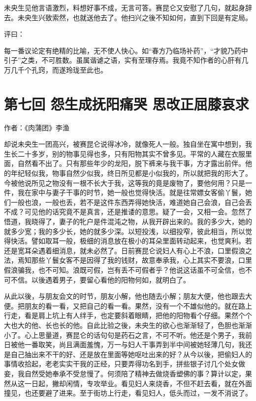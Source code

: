 \documentclass[a4paper,12pt,UTF8,twoside]{ctexbook}
\begin{document}
未央生见他言语激烈，料想好事不成，无言可答。赛昆仑又安慰了几句，就起身辞去。未央生兴致索然，也就送他去了。他扫兴之後不知如何，直到下回是有定局。

评曰：

每一番议论定有绝精的比喻，无不使人快心。如“春方乃临场补药”，“才貌乃药中引子”之类，不可胜数。虽属谐谑之语，实有至理存焉。我竟不知作者的心肝有几万几千个孔窍，而遂玲珑至此也。

\chapter{第七回 怨生成抚阳痛哭 思改正屈膝哀求}

作者：《肉蒲团》李渔

却说未央生一团高兴，被赛昆仑说得冰冷，就像死人一般。独自坐在寓中想到，我生长二十多岁，别的物事见得也多，只有阳物其实不曾多见。平常的人藏在衣服里面，自然看不出了。只有那些年少的龙阳，脱下裤来与我干事，方才露出前伴。他的年纪轻似我，物事自然少似我，终日所见都是小似我的，所以就把我的形大了。今被他说所见之物没有一根不长大于我，这等我的竟是废物了，要他何用？只是一件，我在家中与妻子干事的时节，她一般也觉得快活。就是往常嫖女客偷丫鬟，她们一般也浪，一般也丢，若不是这件东西弄得她快活，难道她自己会浪，自己会丢不成？可见他的话究竟不是真言，还是推诿的意思。疑了一会，又相一会。忽然了悟道，我晓得了，妻子的牝户是件混沌之物，从我开辟出来的。我的多少大，她的就多少宽；我的多少长，她的就多少深。以短投浅，以细投窄，彼此相当，所以觉得快活。譬如取耳一般，极细的消息放在极小的耳朵里面转动起来，也觉爽利。若还是宽耳朵遇着细消息，就未必然了。日前赛昆仑说妇人有心上不浪，口里假浪之法，焉知那些丫鬟女客不是因得了我的钱财，故意奉承我，心上其实不要浪，口里假浪骗我，也不可知。浪既可假，岂有丢不可假者乎？他说这话虽不可全信，也不可不信。以後遇着男子，要留心看他的阳物何如，就明白了。

从此以後，与朋友会文的时节，朋友小解，他也随去小解；朋友大便，他也跟去大便。把朋友的看一看，又把自己的看一看。果然，没有一个不雄似他的。就在路上行走，看是肩上坑上有人绊手，也定要斜着眼睛，把他的阳物看个仔细。果然个个大也大的他、长也长的他。自此比验之後，未央生的欲心也渐渐轻了，色胆也渐渐小了。心上思量道，赛昆仑的话句句是药石之言，不可不听。他还是个男子，我前日被他一番取笑，尚且满面羞愧，万一与妇人干事弄到半中间被她轻薄几句，我还是自己抽出来不干的好、还是放在里面等她呕吐出来的好？从今以後，把偷妇人的事情收拾起，老老实实干我的正经，只要弄得功名到手，拼些银子讨几个处女做妾，我自然受她奉承不受怠慢了。何须陪了精神去做烧香塑佛的事？算计以定，果然从这一日起，撇却闲情，专攻举业。看见妇人来烧香，不但不赶去看，就在外面撞见，也还要避了进来。至于街坊上行走，看见妇人，低头而过，一发不消说了。
\end{document}
